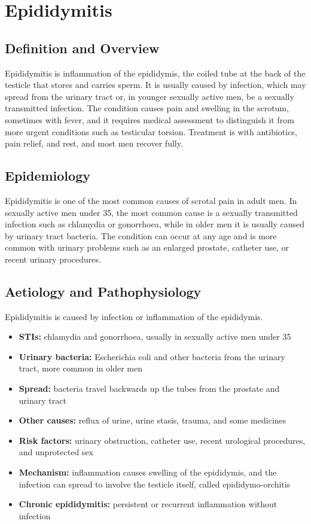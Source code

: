 \chapter{Epididymitis}

\section*{Definition and Overview}
Epididymitis is inflammation of the epididymis, the coiled tube at the back of the testicle that stores and carries sperm. It is usually caused by infection, which may spread from the urinary tract or, in younger sexually active men, be a sexually transmitted infection. The condition causes pain and swelling in the scrotum, sometimes with fever, and it requires medical assessment to distinguish it from more urgent conditions such as testicular torsion. Treatment is with antibiotics, pain relief, and rest, and most men recover fully.

\section*{Epidemiology}
Epididymitis is one of the most common causes of scrotal pain in adult men. In sexually active men under 35, the most common cause is a sexually transmitted infection such as chlamydia or gonorrhoea, while in older men it is usually caused by urinary tract bacteria. The condition can occur at any age and is more common with urinary problems such as an enlarged prostate, catheter use, or recent urinary procedures.

\section*{Aetiology and Pathophysiology}
Epididymitis is caused by infection or inflammation of the epididymis.
\begin{itemize}
    \item \textbf{STIs:} chlamydia and gonorrhoea, usually in sexually active men under 35
    \item \textbf{Urinary bacteria:} Escherichia coli and other bacteria from the urinary tract, more common in older men
    \item \textbf{Spread:} bacteria travel backwards up the tubes from the prostate and urinary tract
    \item \textbf{Other causes:} reflux of urine, urine stasis, trauma, and some medicines
    \item \textbf{Risk factors:} urinary obstruction, catheter use, recent urological procedures, and unprotected sex
    \item \textbf{Mechanism:} inflammation causes swelling of the epididymis, and the infection can spread to involve the testicle itself, called epididymo-orchitis
    \item \textbf{Chronic epididymitis:} persistent or recurrent inflammation without infection
\end{itemize}

